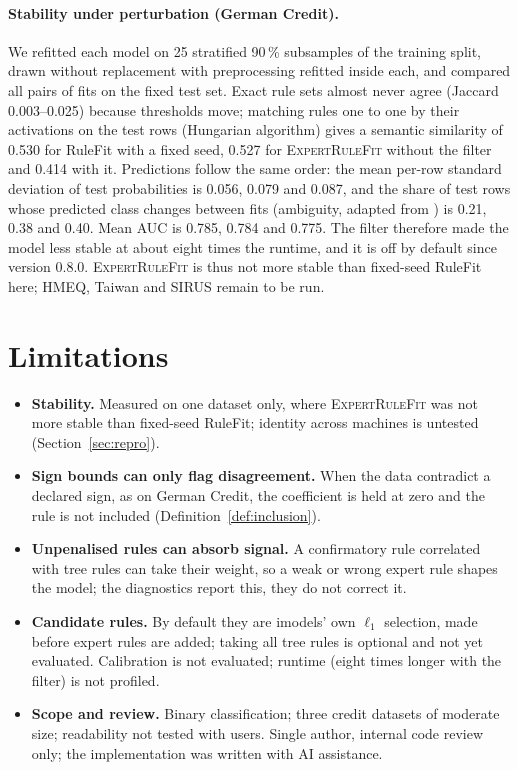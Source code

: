 \documentclass[11pt,a4paper]{article}
\theoremstyle{definition}\newtheorem{definition}{Definition}
\begin{document}
\paragraph{Stability under perturbation (German Credit).} We refitted each model on 25 stratified 90\,\% subsamples of the training split, drawn without replacement with preprocessing refitted inside each, and compared all pairs of fits on the fixed test set. Exact rule sets almost never agree (Jaccard 0.003--0.025) because thresholds move; matching rules one to one by their activations on the test rows (Hungarian algorithm) gives a semantic similarity of 0.530 for RuleFit with a fixed seed, 0.527 for \textsc{ExpertRuleFit} without the filter and 0.414 with it. Predictions follow the same order: the mean per-row standard deviation of test probabilities is 0.056, 0.079 and 0.087, and the share of test rows whose predicted class changes between fits (ambiguity, adapted from \citealp{marx2020}) is 0.21, 0.38 and 0.40. Mean AUC is 0.785, 0.784 and 0.775. The filter therefore made the model less stable at about eight times the runtime, and it is off by default since version 0.8.0. \textsc{ExpertRuleFit} is thus not more stable than fixed-seed RuleFit here; HMEQ, Taiwan and SIRUS remain to be run.

\section{Limitations}\label{sec:limits}

\begin{itemize}
  \item \textbf{Stability.} Measured on one dataset only, where \textsc{ExpertRuleFit} was not more stable than fixed-seed RuleFit; identity across machines is untested (Section~\ref{sec:repro}).
  \item \textbf{Sign bounds can only flag disagreement.} When the data contradict a declared sign, as on German Credit, the coefficient is held at zero and the rule is not included (Definition~\ref{def:inclusion}).
  \item \textbf{Unpenalised rules can absorb signal.} A confirmatory rule correlated with tree rules can take their weight, so a weak or wrong expert rule shapes the model; the diagnostics report this, they do not correct it.
  \item \textbf{Candidate rules.} By default they are imodels' own $\ell_1$ selection, made before expert rules are added; taking all tree rules is optional and not yet evaluated. Calibration is not evaluated; runtime (eight times longer with the filter) is not profiled.
  \item \textbf{Scope and review.} Binary classification; three credit datasets of moderate size; readability not tested with users. Single author, internal code review only; the implementation was written with AI assistance.
\end{itemize}
\end{document}
